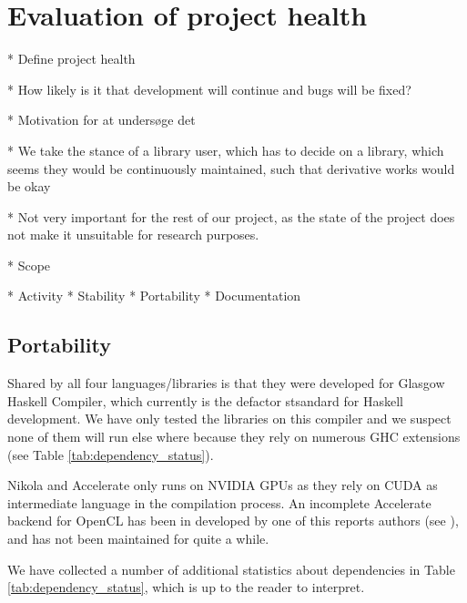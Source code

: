\chapter{Evaluation of project health}
\label{chap:project-health}

* Define project health
  
  * How likely is it that development will continue and bugs will be fixed?

* Motivation for at undersøge det
  
  * We take the stance of a library user, which has to decide on
    a library, which seems they would be continuously maintained, such
    that derivative works would be okay

  * Not very important for the rest of our project, as the state of
    the project does not make it unsuitable for research purposes.

* Scope
  
  * Activity
  * Stability
  * Portability
  * Documentation

\section{Portability}
  


Shared by all four languages/libraries is that they were developed for
Glasgow Haskell Compiler, which currently is the defactor stsandard
for Haskell development. We have only tested the libraries on this
compiler and we suspect none of them will run else where because they
rely on numerous GHC extensions (see Table
\ref{tab:dependency_status}).

Nikola and Accelerate only runs on NVIDIA GPUs as they rely on CUDA as
intermediate language in the compilation process. An incomplete
Accelerate backend for OpenCL has been in developed by one of this
reports authors (see ), and has not been maintained for
quite a while.

We have collected a number of additional statistics about dependencies
in Table \ref{tab:dependency_status}, which is up to the reader to
interpret.


